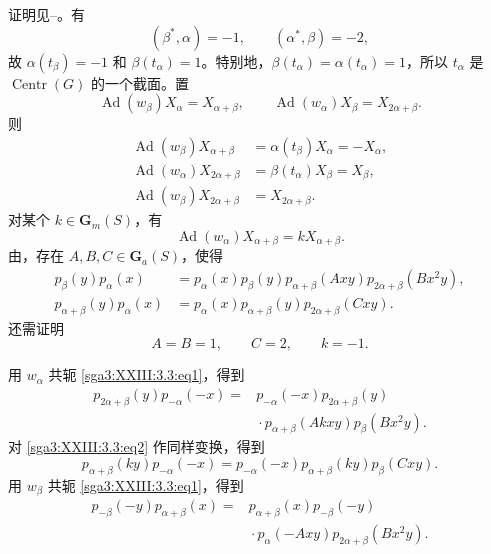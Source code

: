 证明见--。有
\[
  (\beta^*,\alpha)=-1,\qquad(\alpha^*,\beta)=-2,
\]
故 \(\alpha(t_\beta)=-1\) 和 \(\beta(t_\alpha)=1\)。特别地，\(\beta(t_\alpha)=\alpha(t_\alpha)=1\)，所以 \(t_\alpha\) 是 \(\operatorname{Centr}(G)\) 的一个截面。置
\[
  \operatorname{Ad}(w_\beta)X_\alpha=X_{\alpha+\beta},
  \qquad
  \operatorname{Ad}(w_\alpha)X_\beta=X_{2\alpha+\beta}.
\]
则
\[
\begin{aligned}
  \operatorname{Ad}(w_\beta)X_{\alpha+\beta}
    &=\alpha(t_\beta)X_\alpha=-X_\alpha,\\
  \operatorname{Ad}(w_\alpha)X_{2\alpha+\beta}
    &=\beta(t_\alpha)X_\beta=X_\beta,\\
  \operatorname{Ad}(w_\beta)X_{2\alpha+\beta}
    &=X_{2\alpha+\beta}.
\end{aligned}
\]
对某个 \(k\in\mathbf G_m(S)\)，有
\[
  \operatorname{Ad}(w_\alpha)X_{\alpha+\beta}
    =kX_{\alpha+\beta}.
\]
由，存在 \(A,B,C\in\mathbf G_a(S)\)，使得
\begin{align}
  p_\beta(y)p_\alpha(x)
    &=p_\alpha(x)p_\beta(y)p_{\alpha+\beta}(Axy)
      p_{2\alpha+\beta}(Bx^2y), \tag{1}\label{sga3:XXIII:3.3:eq1}\\
  p_{\alpha+\beta}(y)p_\alpha(x)
    &=p_\alpha(x)p_{\alpha+\beta}(y)
      p_{2\alpha+\beta}(Cxy). \tag{2}\label{sga3:XXIII:3.3:eq2}
\end{align}
还需证明
\[
  A=B=1,\qquad C=2,\qquad k=-1.
\]

用 \(w_\alpha\) 共轭 \eqref{sga3:XXIII:3.3:eq1}，得到
\begin{equation}
\begin{aligned}
  p_{2\alpha+\beta}(y)p_{-\alpha}(-x)
    ={}&p_{-\alpha}(-x)p_{2\alpha+\beta}(y)\\
      &{}\cdot p_{\alpha+\beta}(Akxy)p_\beta(Bx^2y).
\end{aligned}
\tag{3}\label{sga3:XXIII:3.3:eq3}
\end{equation}
对 \eqref{sga3:XXIII:3.3:eq2} 作同样变换，得到
\begin{equation}
  p_{\alpha+\beta}(ky)p_{-\alpha}(-x)
   =p_{-\alpha}(-x)p_{\alpha+\beta}(ky)p_\beta(Cxy).
\tag{4}\label{sga3:XXIII:3.3:eq4}
\end{equation}
用 \(w_\beta\) 共轭 \eqref{sga3:XXIII:3.3:eq1}，得到
\begin{equation}
\begin{aligned}
  p_{-\beta}(-y)p_{\alpha+\beta}(x)
    ={}&p_{\alpha+\beta}(x)p_{-\beta}(-y)\\
      &{}\cdot p_\alpha(-Axy)p_{2\alpha+\beta}(Bx^2y).
\end{aligned}
\tag{5}\label{sga3:XXIII:3.3:eq5}
\end{equation}

